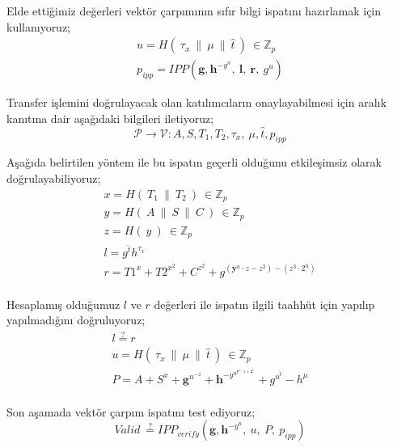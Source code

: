\documentclass[a4paper,11pt]{article}
\begin{document}
Elde ettiğimiz değerleri vektör çarpımının sıfır bilgi ispatını hazırlamak için kullanıyoruz;
$$
\begin{array}{l}
u=H(\ \tau _{x} \ \| \ \mu \ \| \ \hat{t} \ )\ \in \mathbb{Z}_{p}\\
p_{ipp} =IPP\left(\mathbf{g,h}^{-y^{n}} ,\ \mathbf{l} ,\ \mathbf{r} ,\ g^{u}\right)
\end{array}
$$

Transfer işlemini doğrulayacak olan katılımcıların onaylayabilmesi için aralık kanıtına dair aşağıdaki bilgileri iletiyoruz;
$$\mathcal{P}\rightarrow \mathcal{V} :A,S,T_{1} ,T_{2} ,\tau _{x} ,\ \mu ,\hat{t} ,p_{ipp}$$

Aşağıda belirtilen yöntem ile bu ispatın geçerli olduğunu etkileşimsiz olarak doğrulayabiliyoruz;
$$
\begin{array}{l}
x=H(\ T_{1} \ \| \ T_{2} \ )\ \in \mathbb{Z}_{p}\\
y=H(\ A\ \| \ S\ \| \ C\ )\ \in \mathbb{Z}_{p}\\
z=H(\ y\ )\ \in \mathbb{Z}_{p}\\
l=g^{\hat{t}} h^{\tau _{x}}\\
r=T1^{x} +T2^{x^{2}} +C^{z^{2}} +g^{(\mathbf{y}^{n} \cdot z-z^{2}) -(z^{3} \cdot 2^{n})}\\
\end{array}
$$

Hesaplamış olduğumuz $l$ ve $r$ değerleri ile ispatın ilgili taahhüt için yapılıp yapılmadığını doğruluyoruz;
$$
\begin{array}{l}
l\stackrel{?}{=} r\\
u=H(\ \tau _{x} \ \| \ \mu \ \| \ \hat{t} \ )\ \in \mathbb{Z}_{p}\\
P=A+S^{x} +\mathbf{g}^{n^{-z}} +\mathbf{h}^{-y^{n^{\mathbf{y}^{n} \cdot z+\mathbf{2}^{n}}}} +g^{u^{\hat{t}}} -h^{\mu }\\
\end{array}
$$

Son aşamada vektör çarpım ispatını test ediyoruz;
$$Valid\ \stackrel{?}{=} IPP_{verify}\left(\mathbf{g,h}^{-y^{n}} ,\ u,\ P,\ p_{ipp}\right)$$
\end{document}
